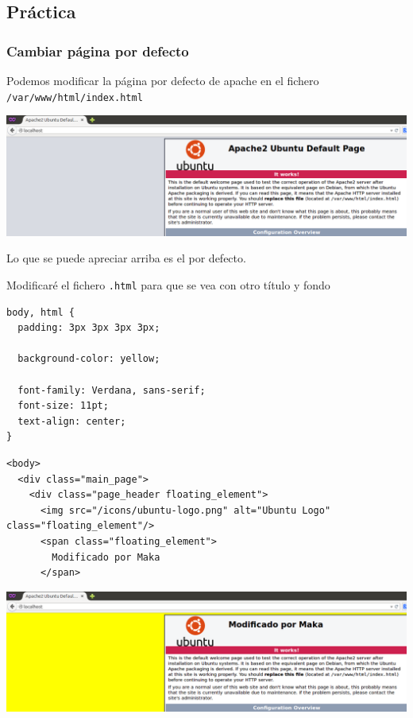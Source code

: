 \documentclass[11pt]{article}
\begin{document}
\subsection{Práctica}
\label{sec:org3f4bc39}
\subsubsection{Cambiar página por defecto}
\label{sec:orge116201}
Podemos modificar la página por defecto de apache en el fichero \texttt{/var/www/html/index.html}

\begin{center}
\includegraphics[width=.9\linewidth]{./media/apache-1.png}
\end{center}

Lo que se puede apreciar arriba es el por defecto.

Modificaré el fichero \texttt{.html} para que se vea con otro título y fondo

\begin{verbatim}
body, html {
  padding: 3px 3px 3px 3px;

  background-color: yellow;

  font-family: Verdana, sans-serif;
  font-size: 11pt;
  text-align: center;
}
\end{verbatim}

\begin{verbatim}
<body>
  <div class="main_page">
    <div class="page_header floating_element">
      <img src="/icons/ubuntu-logo.png" alt="Ubuntu Logo" class="floating_element"/>
      <span class="floating_element">
        Modificado por Maka
      </span>
\end{verbatim}

\begin{center}
\includegraphics[width=.9\linewidth]{./media/apache-2.png}
\end{center}
\end{document}
